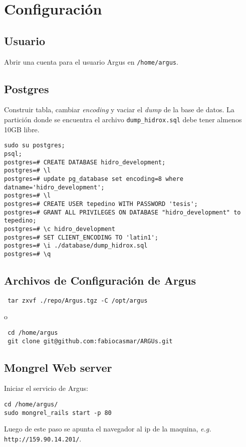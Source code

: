 \documentclass[spanish,10pt]{article}
\begin{document}
\section{Configuración}
\subsection{Usuario}
Abrir una cuenta para el usuario Argus en \texttt{/home/argus}.

\subsection{Postgres}
Construir tabla, cambiar \emph{encoding} y vaciar el \emph{dump} de la base de datos. La partición donde se encuentra el archivo 
\verb+dump_hidrox.sql+ debe tener almenos 10GB libre.
\begin{verbatim}
sudo su postgres; 
psql;
postgres=# CREATE DATABASE hidro_development;
postgres=# \l
postgres=# update pg_database set encoding=8 where datname='hidro_development';
postgres=# \l
postgres=# CREATE USER tepedino WITH PASSWORD 'tesis';
postgres=# GRANT ALL PRIVILEGES ON DATABASE "hidro_development" to tepedino;
postgres=# \c hidro_development
postgres=# SET CLIENT_ENCODING TO 'latin1';
postgres=# \i ./database/dump_hidrox.sql
postgres=# \q
\end{verbatim}
\subsection{Archivos de Configuración de Argus}
\begin{verbatim}
 tar zxvf ./repo/Argus.tgz -C /opt/argus
\end{verbatim}
o
\begin{verbatim}
 cd /home/argus
 git clone git@github.com:fabiocasmar/ARGUs.git
\end{verbatim}
\subsection{Mongrel Web server}
Iniciar el servicio de Argus: 
\begin{verbatim}
cd /home/argus/
sudo mongrel_rails start -p 80
\end{verbatim}
Luego de este paso se apunta el navegador al ip de la maquina, \emph{e.g.} \texttt{http://159.90.14.201/}.
\end{document}
